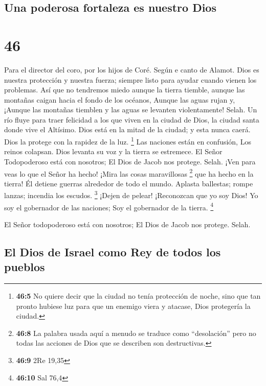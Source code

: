 \hypertarget{una-poderosa-fortaleza-es-nuestro-dios}{%
\subsection{Una poderosa fortaleza es nuestro
Dios}\label{una-poderosa-fortaleza-es-nuestro-dios}}

\hypertarget{section-45}{%
\section{46}\label{section-45}}

Para el director del coro, por los hijos de Coré. Según e canto de
Alamot.  Dios es nuestra protección y nuestra fuerza;
siempre listo para ayudar cuando vienen los problemas. 
Así que no tendremos miedo aunque la tierra tiemble, aunque las montañas
caigan hacia el fondo de los océanos,  Aunque las aguas
rujan y, ¡Aunque las montañas tiemblen y las aguas se levanten
violentamente! Selah.  Un río fluye para traer felicidad a
los que viven en la ciudad de Dios, la ciudad santa donde vive el
Altísimo.  Dios está en la mitad de la ciudad; y esta
nunca caerá. Dios la protege con la rapidez de la luz. \footnote{\textbf{46:5}
  No quiere decir que la ciudad no tenía protección de noche, sino que
  tan pronto hubiese luz para que un enemigo viera y atacase, Dios
  protegería la ciudad.}  Las naciones están en confusión,
Los reinos colapsan. Dios levanta su voz y la tierra se estremece.
 El Señor Todopoderoso está con nosotros; El Dios de Jacob
nos protege. Selah.  ¡Ven para veas lo que el Señor ha
hecho! ¡Mira las cosas maravillosas \footnote{\textbf{46:8} La palabra
  usada aquí a menudo se traduce como ``desolación'' pero no todas las
  acciones de Dios que se describen son destructivas.} que ha hecho en
la tierra!  Él detiene guerras alrededor de todo el mundo.
Aplasta ballestas; rompe lanzas; incendia los escudos. \footnote{\textbf{46:9}
  2Re 19,35}  ¡Dejen de pelear! ¡Reconozcan que yo soy
Dios! Yo soy el gobernador de las naciones; Soy el gobernador de la
tierra. \footnote{\textbf{46:10} Sal 76,4}

 El Señor todopoderoso está con nosotros; El Dios de
Jacob nos protege. Selah.

\hypertarget{el-dios-de-israel-como-rey-de-todos-los-pueblos}{%
\subsection{El Dios de Israel como Rey de todos los
pueblos}\label{el-dios-de-israel-como-rey-de-todos-los-pueblos}}

